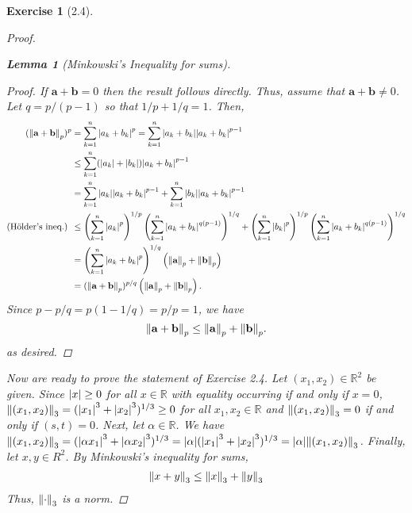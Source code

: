 \documentclass[11pt]{article}
\newtheorem{lemma}[theorem]{Lemma}
\newtheorem{exercise}{Exercise}
\newcommand*{\myproofname}{Proof}
\newenvironment{subproof}[1][\myproofname]{\begin{proof}[#1]\renewcommand*{\qedsymbol}{$\mathbin{/\mkern-6mu/}$}}{\end{proof}}
\newcommand{\R}{\mathbb{R}}
\newcommand{\lp}{\left(}
\newcommand{\rp}{\right)}
\begin{document}
\begin{exercise}[2.4]
\begin{proof}
\begin{lemma}[Minkowski's Inequality for sums]
			\begin{subproof}
				If $\mathbf{a} + \mathbf{b} = 0$ then the result follows directly. Thus, assume that $\mathbf{a} + \mathbf{b} \neq 0$. Let $q = p/(p-1)$ so that $1/p + 1/q = 1$. Then,
				\begin{align*}
				(\norm{\mathbf{a} + \mathbf{b}}_p)^p
				&= \sum^n_{k=1}\abs{a_k + b_k}^p = \sum^n_{k=1}\abs{a_k + b_k}\abs{a_k + b_k}^{p-1} \\
				&\leq  \sum^n_{k=1}(\abs{a_k} + \abs{b_k})\abs{a_k + b_k}^{p-1} \\
				&=  \sum^n_{k=1}\abs{a_k}\abs{a_k + b_k}^{p-1} + \sum^n_{k=1}\abs{b_k}\abs{a_k + b_k}^{p-1} \\
				\mbox{(H\"{o}lder's ineq.) } &\leq \lp \sum^n_{k=1}\abs{a_k}^p \rp^{1/p}\lp \sum^n_{k=1}\abs{a_k + b_k}^{q(p-1)} \rp^{1/q} + \lp \sum^n_{k=1}\abs{b_k}^p \rp^{1/p}\lp \sum^n_{k=1}\abs{a_k + b_k}^{q(p-1)} \rp^{1/q} \\
				&=  \lp \sum^n_{k=1}\abs{a_k + b_k}^{p} \rp^{1/q} 
				\lp \norm{\mathbf{a}}_p + \norm{\mathbf{b}}_p \rp \\
				&= (\norm{\mathbf{a} + \mathbf{b}}_p)^{p/q}\lp \norm{\mathbf{a}}_p + \norm{\mathbf{b}}_p \rp.
				\end{align*}
				Since $p - p/q = p(1-1/q) = p/p = 1$, we have
				\begin{equation*}
				\norm{\mathbf{a} + \mathbf{b}}_p \leq \norm{\mathbf{a}}_p + \norm{\mathbf{b}}_p .
				\end{equation*}
				as desired.
			\end{subproof}
		\end{lemma}
		
		
		
		Now are ready to prove the statement of Exercise 2.4. Let $(x_1,x_2) \in \R^2$ be given. Since $\abs{x} \geq 0$ for all $x \in \R$ with equality occurring if and only if $x=0$, $\norm{(x_1,x_2)}_3 = (\abs{x_1}^3 + \abs{x_2}^3)^{1/3} \geq 0$ for all $x_1,x_2\in \R$ and $\norm{(x_1,x_2)}_3 = 0$ if and only if $(s,t) = 0$. Next, let $\alpha\in \R$. We have $\norm{(x_1,x_2)}_3 = (\abs{\alpha x_1}^3 + \abs{\alpha x_2}^3)^{1/3} = \abs{\alpha}(\abs{x_1}^3 + \abs{x_2}^3)^{1/3} = \abs{\alpha}\norm{(x_1,x_2)}_3$. Finally, let $x,y\in R^2$. By Minkowski's inequality for sums, 
			\begin{align*}
			\norm{x+y}_3 \leq \norm{x}_3 + \norm{y}_3
			\end{align*}
		Thus, $\norm{\cdot}_3$ is a norm.
	\end{proof}
\end{exercise}
\end{document}
